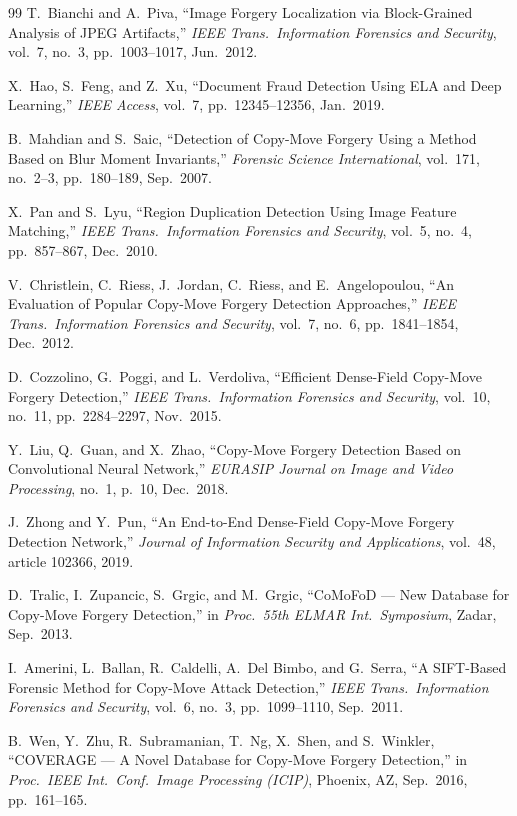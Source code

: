 \documentclass[12pt,a4paper,oneside]{report}
\begin{document}
\begin{thebibliography}{99}
T.~Bianchi and A.~Piva,
``Image Forgery Localization via Block-Grained Analysis of JPEG Artifacts,''
\textit{IEEE Trans.\ Information Forensics and Security},
vol.~7, no.~3, pp.~1003--1017, Jun.\ 2012.

X.~Hao, S.~Feng, and Z.~Xu,
``Document Fraud Detection Using ELA and Deep Learning,''
\textit{IEEE Access}, vol.~7, pp.~12345--12356, Jan.\ 2019.

B.~Mahdian and S.~Saic,
``Detection of Copy-Move Forgery Using a Method Based on Blur Moment Invariants,''
\textit{Forensic Science International},
vol.~171, no.~2--3, pp.~180--189, Sep.\ 2007.

X.~Pan and S.~Lyu,
``Region Duplication Detection Using Image Feature Matching,''
\textit{IEEE Trans.\ Information Forensics and Security},
vol.~5, no.~4, pp.~857--867, Dec.\ 2010.

V.~Christlein, C.~Riess, J.~Jordan, C.~Riess, and E.~Angelopoulou,
``An Evaluation of Popular Copy-Move Forgery Detection Approaches,''
\textit{IEEE Trans.\ Information Forensics and Security},
vol.~7, no.~6, pp.~1841--1854, Dec.\ 2012.

D.~Cozzolino, G.~Poggi, and L.~Verdoliva,
``Efficient Dense-Field Copy-Move Forgery Detection,''
\textit{IEEE Trans.\ Information Forensics and Security},
vol.~10, no.~11, pp.~2284--2297, Nov.\ 2015.

Y.~Liu, Q.~Guan, and X.~Zhao,
``Copy-Move Forgery Detection Based on Convolutional Neural Network,''
\textit{EURASIP Journal on Image and Video Processing},
no.~1, p.~10, Dec.\ 2018.

J.~Zhong and Y.~Pun,
``An End-to-End Dense-Field Copy-Move Forgery Detection Network,''
\textit{Journal of Information Security and Applications},
vol.~48, article 102366, 2019.

D.~Tralic, I.~Zupancic, S.~Grgic, and M.~Grgic,
``CoMoFoD --- New Database for Copy-Move Forgery Detection,''
in \textit{Proc.\ 55th ELMAR Int.\ Symposium}, Zadar, Sep.\ 2013.

I.~Amerini, L.~Ballan, R.~Caldelli, A.~Del Bimbo, and G.~Serra,
``A SIFT-Based Forensic Method for Copy-Move Attack Detection,''
\textit{IEEE Trans.\ Information Forensics and Security},
vol.~6, no.~3, pp.~1099--1110, Sep.\ 2011.

B.~Wen, Y.~Zhu, R.~Subramanian, T.~Ng, X.~Shen, and S.~Winkler,
``COVERAGE --- A Novel Database for Copy-Move Forgery Detection,''
in \textit{Proc.\ IEEE Int.\ Conf.\ Image Processing (ICIP)},
Phoenix, AZ, Sep.\ 2016, pp.~161--165.


\end{thebibliography}
\end{document}
